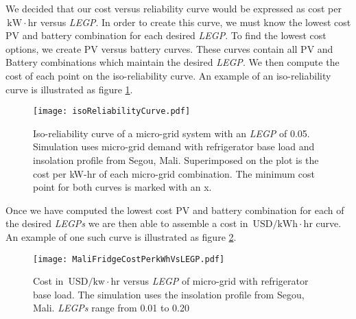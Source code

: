 \documentclass{article}
\newcommand{\unit}[1]{\ensuremath{\, \mathrm{#1}}}
\begin{document}
We decided that our cost versus reliability curve would be expressed as cost per \unit{kW \! \cdot \! hr} versus \emph{LEGP}.
In order to create this curve, we must know the lowest cost PV and battery combination for each desired \emph{LEGP}.
To find the lowest cost options, we create PV versus battery curves.
These curves contain all PV and Battery combinations which maintain the desired \emph{LEGP}. 
We then compute the cost of each point on the iso-reliability curve.
An example of an iso-reliability curve is illustrated as figure \ref{energyBalance}.
\begin{figure}[ht] 
  \centering
    \texttt{[image: isoReliabilityCurve.pdf]}
  \caption{Iso-reliability curve of a micro-grid system with an \emph{LEGP} of 0.05. 
Simulation uses micro-grid demand with refrigerator base load and insolation profile from Segou, Mali.
Superimposed on the plot is the cost per kW-hr of each micro-grid combination.
The minimum cost point for both curves is marked with an x.}
\label{energyBalance}
\end{figure}
Once we have computed the lowest cost PV and battery combination for each of the desired \emph{LEGPs} we are then able to assemble a cost in \unit{USD/kWh\! \cdot \!hr} curve. 
An example of one such curve is illustrated as figure \ref{MaliFridgeCostPerkWhVsLEGP}.

\begin{figure}[ht] 
  \centering
    \texttt{[image: MaliFridgeCostPerkWhVsLEGP.pdf]}
  \caption{Cost in \unit{USD/kw\! \cdot \! hr} versus \emph{LEGP} of 
micro-grid with refrigerator base load.
The simulation uses the insolation profile from Segou, Mali.
\emph{LEGPs} range from 0.01 to 0.20}
\label{MaliFridgeCostPerkWhVsLEGP}
\end{figure}
\end{document}
